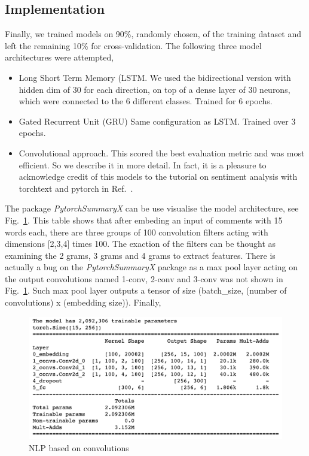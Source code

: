 \documentclass{report}
\begin{document}
\subsection{Implementation}

Finally, we trained models on 90\%, randomly chosen, of the training dataset and left the remaining 10\% 
for cross-validation. The following three model architectures were attempted, 
\begin{itemize}
\item Long Short Term Memory (LSTM. We used the 
bidirectional version with hidden dim of 30 for each direction, on top of a dense layer of 30 neurons, 
which were connected to the 6 different classes. Trained for 6 epochs. 

\item Gated Recurrent Unit (GRU) Same configuration 
as LSTM. Trained over 3 epochs. 
\item Convolutional approach. This scored the best evaluation metric
and was most efficient. So we describe it in more detail. In fact, it is a pleasure
to acknowledge credit of this models to the tutorial on sentiment analysis with 
torchtext and pytorch in Ref.~\cite{BT}.
\end{itemize}

The package \emph{PytorchSummaryX} can be use visualise the model architecture, see  
Fig.~\ref{fig:cnn}. This table shows that after embeding an input of comments with 15 words each, there are 
three groups of 100 convolution filters acting with dimensions [2,3,4] times 100. The exaction of the filters can be thought as examining the 
2 grams, 3 grams and 4 grams to extract features.  There is actually a bug on the \emph{PytorchSummaryX} 
package as a max pool layer  acting
on the output convolutions named 1-conv,  2-conv and 3-conv was not shown in Fig.~\ref{fig:cnn}. Such max pool layer outputs a tensor of size 
(batch\_size, (number of convolutions) x (embedding size)). Finally, 
\begin{figure}[!h]
\centering
  \includegraphics[width=150mm]{../local/plots_tables/cnn.png}
  \caption{NLP based on convolutions}
  \label{fig:cnn}
\end{figure}
\end{document}
